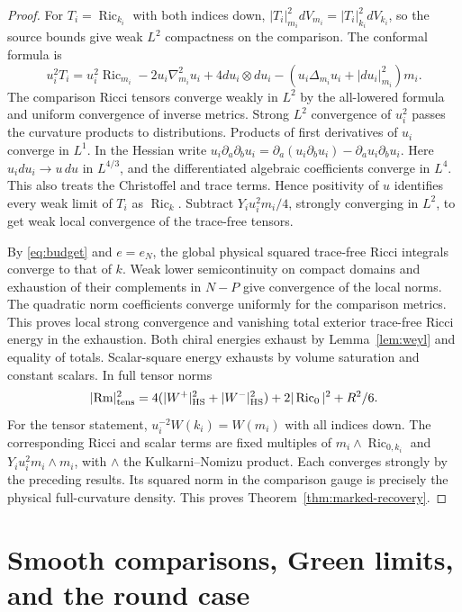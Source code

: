 \documentclass[11pt]{article}
\theoremstyle{definition}
\theoremstyle{remark}
\begin{document}
\begin{proof}
For \(T_i=\operatorname{Ric}_{k_i}\) with both indices down, \(|T_i|_{m_i}^2dV_{m_i}=|T_i|_{k_i}^2dV_{k_i}\), so the source bounds give weak \(L^2\) compactness on the comparison. The conformal formula is
\[
 u_i^2T_i=u_i^2\operatorname{Ric}_{m_i}-2u_i\nabla^2_{m_i}u_i
 +4du_i\otimes du_i-(u_i\Delta_{m_i}u_i+|du_i|_{m_i}^2)m_i.
\]
The comparison Ricci tensors converge weakly in \(L^2\) by the all-lowered formula and uniform convergence of inverse metrics. Strong \(L^2\) convergence of \(u_i^2\) passes the curvature products to distributions. Products of first derivatives of \(u_i\) converge in \(L^1\). In the Hessian write \(u_i\partial_a\partial_bu_i=\partial_a(u_i\partial_bu_i)-\partial_a u_i\partial_bu_i\). Here \(u_i du_i\to u\,du\) in \(L^{4/3}\), and the differentiated algebraic coefficients converge in \(L^4\). This also treats the Christoffel and trace terms. Hence positivity of \(u\) identifies every weak limit of \(T_i\) as \(\operatorname{Ric}_k\). Subtract \(Y_i u_i^2m_i/4\), strongly converging in \(L^2\), to get weak local convergence of the trace-free tensors.

By \eqref{eq:budget} and \(e=e_N\), the global physical squared trace-free Ricci integrals converge to that of \(k\). Weak lower semicontinuity on compact domains and exhaustion of their complements in \(N-P\) give convergence of the local norms. The quadratic norm coefficients converge uniformly for the comparison metrics. This proves local strong convergence and vanishing total exterior trace-free Ricci energy in the exhaustion. Both chiral energies exhaust by Lemma~\ref{lem:weyl} and equality of totals. Scalar-square energy exhausts by volume saturation and constant scalars. In full tensor norms
\[
 |\mathrm{Rm}|_{\rm tens}^2
 =4(|W^+|_{\rm HS}^2+|W^-|_{\rm HS}^2)+2|\operatorname{Ric}_0|^2+R^2/6 .
\]
For the tensor statement, \(u_i^{-2}W(k_i)=W(m_i)\) with all indices down. The corresponding Ricci and scalar terms are fixed multiples of \(m_i\mathbin{\wedge}\operatorname{Ric}_{0,k_i}\) and \(Y_i u_i^2m_i\mathbin{\wedge} m_i\), with \(\mathbin{\wedge}\) the Kulkarni--Nomizu product. Each converges strongly by the preceding results. Its squared norm in the comparison gauge is precisely the physical full-curvature density. This proves Theorem~\ref{thm:marked-recovery}.
\end{proof}

\section{Smooth comparisons, Green limits, and the round case}\label{sec:smooth}
\end{document}
